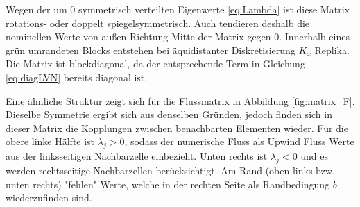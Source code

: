 Wegen der um 0 symmetrisch verteilten Eigenwerte \eqref{eq:Lambda} ist diese Matrix rotations- oder doppelt spiegelsymmetrisch. Auch tendieren deshalb die nominellen Werte von außen Richtung Mitte der Matrix gegen 0. Innerhalb eines grün umrandeten Blocks entstehen bei äquidistanter Diskretisierung  $K_x$ Replika. Die Matrix ist blockdiagonal, da der entsprechende Term in Gleichung \eqref{eq:diagLVN} bereits diagonal ist.

Eine ähnliche Struktur zeigt sich für die Flussmatrix in Abbildung \ref{fig:matrix_F}. Dieselbe Symmetrie ergibt sich aus denselben Gründen, jedoch finden sich in dieser Matrix die Kopplungen zwischen benachbarten Elementen wieder. Für die obere linke Hälfte ist $\lambda_j>0$, sodass der numerische Fluss als Upwind Fluss  Werte aus der linksseitigen Nachbarzelle einbezieht. Unten rechts ist $\lambda_j<0$ und es werden rechtsseitige Nachbarzellen berücksichtigt. Am Rand (oben links bzw. unten rechts) "fehlen" Werte, welche in der rechten Seite als Randbedingung $b$ wiederzufinden sind.

